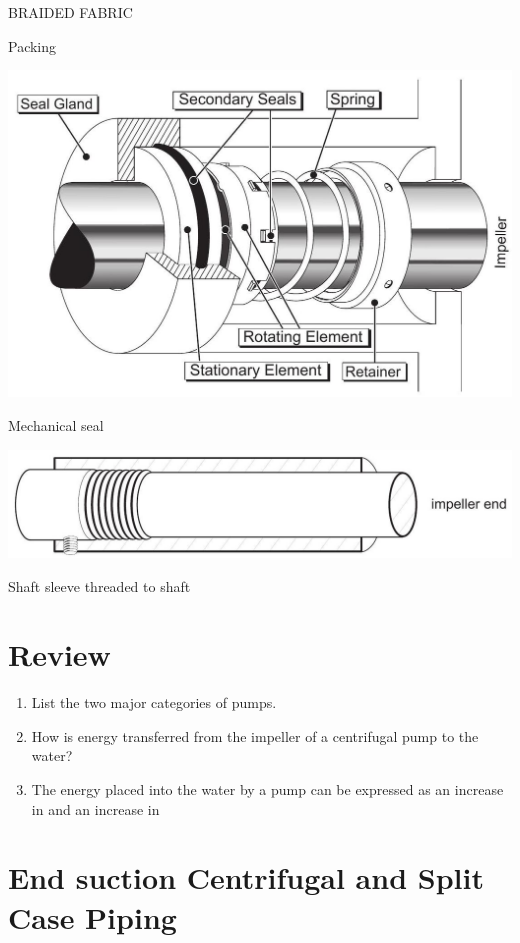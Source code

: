 \documentclass[10pt]{article}
\begin{document}
BRAIDED FABRIC

Packing

\includegraphics[max width=\textwidth]{CentrifugalPumpMechanicalSeal}

Mechanical seal

\includegraphics[max width=\textwidth]{CentrifugalPumpShasftSleeveThreadedtoShaft}

Shaft sleeve threaded to shaft

\section{Review}
\begin{enumerate}
  \item List the two major categories of pumps.

  \item How is energy transferred from the impeller of a centrifugal pump to the water?

  \item The energy placed into the water by a pump can be expressed as an increase in and an increase in

\end{enumerate}
\section{End suction Centrifugal and Split Case Piping}
\end{document}
